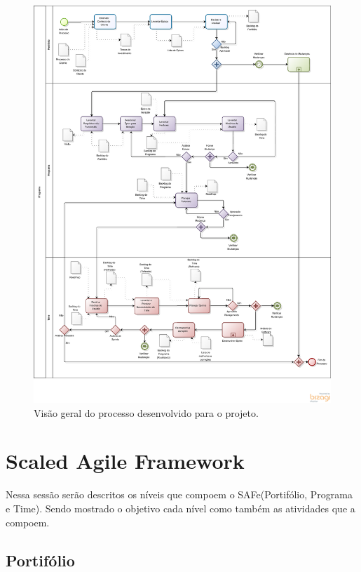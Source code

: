 \begin{figure}[H]
    \centering
	\includegraphics[keepaspectratio=true,scale=0.5]{figuras/Processo_05.eps}
    \caption{Visão geral do processo desenvolvido para o projeto.}
    \label{fig:processo}
\end{figure}

\section{Scaled Agile Framework}\label{safe}

Nessa sessão serão descritos os níveis que compoem o SAFe(Portifólio, Programa e Time).
Sendo mostrado o objetivo cada nível como também as atividades que a compoem.

\subsection{Portifólio}

